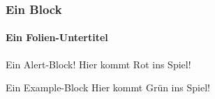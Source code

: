\begin{frame}
	\frametitle{Ein Block}
	\framesubtitle{Ein Folien-Untertitel}

	\begin{alertblock}{Ein Alert-Block!}
		Hier kommt Rot ins Spiel!
	\end{alertblock}
	
	\begin{exampleblock}{Ein Example-Block}
		Hier kommt Grün ins Spiel!
	\end{exampleblock}
\end{frame}
